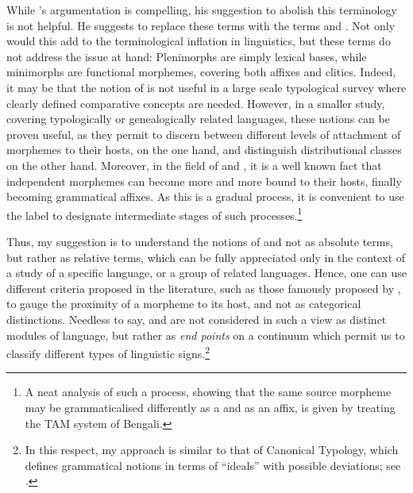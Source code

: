 While \citeauthor{HaspelmathClitics}'s argumentation is compelling, his suggestion to abolish this terminology is not helpful. He suggests to replace these terms with the terms  and . Not only would this add to the terminological inflation in linguistics, but these terms do not address the issue at hand: Plenimorphs are simply lexical bases, while minimorphs are functional morphemes, covering both affixes and clitics.
Indeed, it may be that the notion of  is not useful in a large scale typological survey where clearly defined comparative concepts are needed. However, in a smaller study, covering typologically or genealogically related languages, these notions can be proven useful, as  they permit to discern between different levels of attachment of morphemes to their hosts, on the one hand, and distinguish distributional classes on the other hand. Moreover, in the field of  and , it is a well known fact that independent morphemes can become more and more bound to their hosts, finally becoming grammatical affixes. As this is a gradual process, it is convenient to use the label  to designate intermediate stages of such processes.\footnote{A neat analysis of such a process, showing that the same source morpheme may be grammaticalised differently as a  and as an affix, is given by \citet{LahiriBengali} treating the TAM system of Bengali.}

Thus, my suggestion is to understand the notions of  and  not as absolute terms, but rather as relative terms, which can be fully appreciated only in the context of a study of a specific language, or a group of related languages. Hence, one can use different criteria proposed in the literature, such as those famously proposed by \citet{ZwickyPullum}, to gauge the proximity of a morpheme to its host, and not as categorical distinctions. Needless to say,  and  are not considered in such a view as distinct modules of language, but rather as \textit{end points} on a continuum which permit us to classify different types of linguistic signs.\footnote{In this respect, my approach is  similar to that of Canonical Typology, which defines grammatical notions in terms of \enquote{ideals} with possible deviations; see \citet{BrownChumakina}.} 

